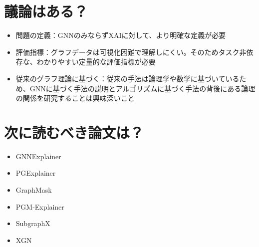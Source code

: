 \documentclass[a4paper,10pt]{ltjsarticle}
\newcommand{\1}{\mbox{1}\hspace{-0.25em}\mbox{l}}
\theoremstyle{definition}
\begin{document}
    \section{議論はある？}
    \begin{itemize}
        \item 問題の定義：GNNのみならずXAIに対して、より明確な定義が必要
        \item 評価指標：グラフデータは可視化困難で理解しにくい。そのためタスク非依存な、わかりやすい定量的な評価指標が必要
        \item 従来のグラフ理論に基づく：従来の手法は論理学や数学に基づいているため、GNNに基づく手法の説明とアルゴリズムに基づく手法の背後にある論理の関係を研究することは興味深いこと
    \end{itemize}


    \section{次に読むべき論文は？}
    \begin{itemize}
        \item GNNExplainer\ \cite{ying2019gnnexplainer}
        \item PGExplainer\ \cite{luo2020parameterized}
        \item GraphMask\ \cite{schlichtkrull2020interpreting}
        \item PGM-Explainer\ \cite{vu2020pgm}
        \item SubgraphX\ \cite{yuan2021explainability}
        \item XGN\ \cite{yuan2020xgnn}
    \end{itemize}

    
    
\end{document}
